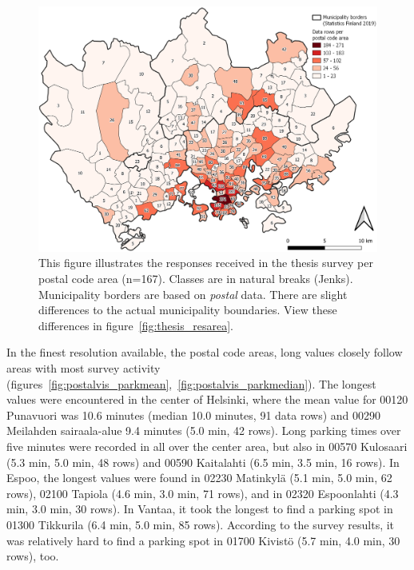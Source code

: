 \begin{figure}[H]%
    \centering
    \includegraphics[width=\textwidth]{images/thesis_postalvis_answers.png}
    \caption[Data rows received per postal code area]{This figure illustrates the responses received in the thesis survey per postal code area (n=167). Classes are in natural breaks (Jenks). Municipality borders are based on \textit{postal} data. There are slight differences to the actual municipality boundaries. View these differences in figure~\ref{fig:thesis_resarea}.}%
    \label{fig:postalvis_answers}%
\end{figure}

In the finest resolution available, the postal code areas, long  values closely follow areas with most survey activity (figures~\ref{fig:postalvis_parkmean},~\ref{fig:postalvis_parkmedian}). The longest  values were encountered in the center of Helsinki, where the mean value for 00120 Punavuori was 10.6 minutes (median 10.0 minutes, 91 data rows) and 00290 Meilahden sairaala-alue 9.4 minutes (5.0 min, 42 rows). Long parking times over five minutes were recorded in all over the center area, but also in 00570 Kulosaari (5.3 min, 5.0 min, 48 rows) and 00590 Kaitalahti (6.5 min, 3.5 min, 16 rows). In Espoo, the longest  values were found in 02230 Matinkylä (5.1 min, 5.0 min, 62 rows), 02100 Tapiola (4.6 min, 3.0 min, 71 rows), and in 02320 Espoonlahti (4.3 min, 3.0 min, 30 rows). In Vantaa, it took the longest to find a parking spot in 01300 Tikkurila (6.4 min, 5.0 min, 85 rows). According to the survey results, it was relatively hard to find a parking spot in 01700 Kivistö (5.7 min, 4.0 min, 30 rows), too.

